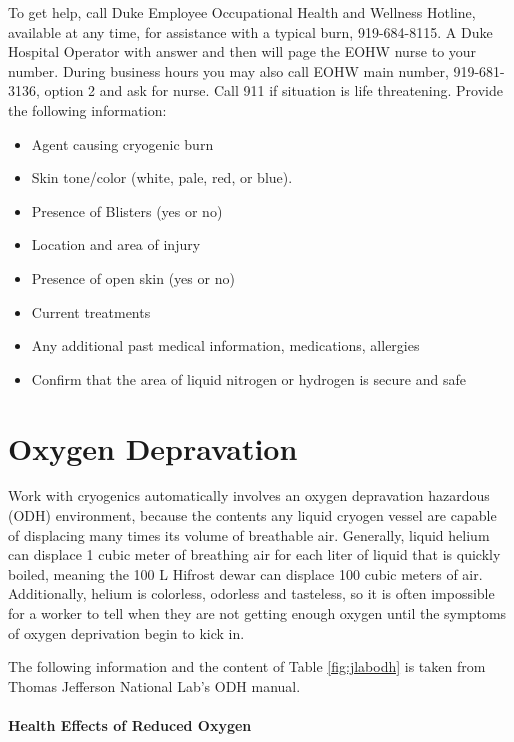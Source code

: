 To get help\cite{epling}, call Duke Employee Occupational Health and Wellness Hotline, available at any time, for assistance with a typical burn, 919-684-8115.  A Duke Hospital Operator with answer and then will page the EOHW nurse to your number.  During business hours you may also call EOHW main number, 919-681-3136, option 2 and ask for nurse.  Call 911 if situation is life threatening.  Provide the following information\cite{epling}:

\begin{itemize}
\item Agent causing cryogenic burn
\item Skin tone/color (white, pale, red, or blue).
\item Presence of Blisters (yes or no)
\item Location and area of injury
\item Presence of open skin (yes or no)
\item Current treatments
\item Any additional past medical information, medications, allergies
\item Confirm that the area of liquid nitrogen or hydrogen is secure and safe
\end{itemize}

\section{Oxygen Depravation}

Work with cryogenics automatically involves an oxygen depravation hazardous (ODH) environment, because the contents any liquid cryogen vessel are capable of displacing many times its volume of breathable air.  Generally, liquid helium can displace 1 cubic meter of breathing air for each liter of liquid that is quickly boiled, meaning the 100 L Hifrost dewar can displace 100 cubic meters of air.  Additionally, helium is colorless, odorless and tasteless, so it is often impossible for a worker to tell when they are not getting enough oxygen until the symptoms of oxygen deprivation begin to kick in.

The following information and the content of Table \ref{fig:jlabodh} is taken from Thomas Jefferson National Lab's ODH manual. \cite{jlabodh}

\paragraph{Health Effects of Reduced Oxygen}

